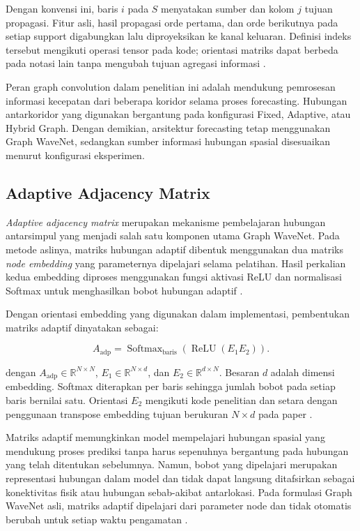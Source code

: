 Dengan konvensi ini, baris $i$ pada $S$ menyatakan sumber dan kolom $j$ tujuan propagasi. Fitur asli, hasil propagasi orde pertama, dan orde berikutnya pada setiap support digabungkan lalu diproyeksikan ke kanal keluaran. Definisi indeks tersebut mengikuti operasi tensor pada kode; orientasi matriks dapat berbeda pada notasi lain tanpa mengubah tujuan agregasi informasi \cite{wu2019graphwavenet}.

Peran graph convolution dalam penelitian ini adalah mendukung pemrosesan informasi kecepatan dari beberapa koridor selama proses forecasting. Hubungan antarkoridor yang digunakan bergantung pada konfigurasi Fixed, Adaptive, atau Hybrid Graph. Dengan demikian, arsitektur forecasting tetap menggunakan Graph WaveNet, sedangkan sumber informasi hubungan spasial disesuaikan menurut konfigurasi eksperimen.

\subsection{Adaptive Adjacency Matrix}
\label{subsec:adaptive_adjacency}

\textit{Adaptive adjacency matrix} merupakan mekanisme pembelajaran hubungan antarsimpul yang menjadi salah satu komponen utama Graph WaveNet. Pada metode aslinya, matriks hubungan adaptif dibentuk menggunakan dua matriks \textit{node embedding} yang parameternya dipelajari selama pelatihan. Hasil perkalian kedua embedding diproses menggunakan fungsi aktivasi ReLU dan normalisasi Softmax untuk menghasilkan bobot hubungan adaptif \cite{wu2019graphwavenet}.

Dengan orientasi embedding yang digunakan dalam implementasi, pembentukan matriks adaptif dinyatakan sebagai:

\begin{equation}
 A_{\mathrm{adp}}=\operatorname{Softmax}_{\mathrm{baris}}\!\left(\operatorname{ReLU}(E_1E_2)\right).
 \label{eq:b2-adaptive}
\end{equation}

dengan $A_{\mathrm{adp}}\in\mathbb{R}^{N\times N}$, $E_1\in\mathbb{R}^{N\times d}$, dan $E_2\in\mathbb{R}^{d\times N}$. Besaran $d$ adalah dimensi embedding. Softmax diterapkan per baris sehingga jumlah bobot pada setiap baris bernilai satu. Orientasi $E_2$ mengikuti kode penelitian dan setara dengan penggunaan transpose embedding tujuan berukuran $N\times d$ pada paper \cite{wu2019graphwavenet}.

Matriks adaptif memungkinkan model mempelajari hubungan spasial yang mendukung proses prediksi tanpa harus sepenuhnya bergantung pada hubungan yang telah ditentukan sebelumnya. Namun, bobot yang dipelajari merupakan representasi hubungan dalam model dan tidak dapat langsung ditafsirkan sebagai konektivitas fisik atau hubungan sebab-akibat antarlokasi. Pada formulasi Graph WaveNet asli, matriks adaptif dipelajari dari parameter node dan tidak otomatis berubah untuk setiap waktu pengamatan \cite{wu2019graphwavenet}.


